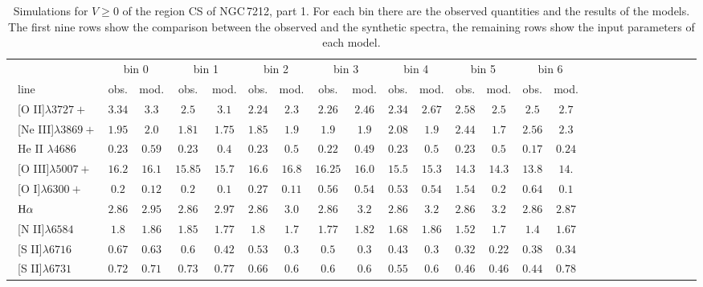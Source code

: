 \documentclass[../thesis.tex]{subfiles}
\begin{document}
\begin{landscape}
\begin{table}

\centering
\caption{Simulations for $V\ge0$ of the region CS of NGC\,7212, part 1. For each bin there are the observed quantities and the results of the models. The first nine rows show the comparison between the observed and the synthetic spectra, the remaining rows show the input parameters of each model.}
\label{tab:sim_cs+1N}


\small{
\begin{tabular}{lcccccccccccccccccccccccc}
\hline
\ &\multicolumn{2}{c}{bin 0} &\multicolumn{2}{c}{bin 1}&\multicolumn{2}{c}{bin 2}&\multicolumn{2}{c}{bin 3}&\multicolumn{2}{c}{bin 4}&\multicolumn{2}{c}{bin 5}&\multicolumn{2}{c}{bin 6}\\
\   line               &obs.  &mod. & obs. &mod.  &obs.&mod.  &obs.   &mod.&obs.  &mod.   &obs.  &mod.&obs.&mod.\\ \hline
\ [O II]$\lambda3727+$          &$3.34  $&$3.3   $&$2.5    $&$ 3.1  $&$2.24 $&$2.3   $&$2.26  $&$2.46 $&$2.34  $&$2.67  $&$2.58  $&$2.5$&$2.5$&$2.7$\\
\  [Ne III]$\lambda3869+$        &$1.95  $&$2.0   $&$1.81   $&$ 1.75 $&$1.85 $&$1.9   $&$1.9   $&$1.9   $&$2.08  $&$1.9   $&$2.44  $&$1.7$&$2.56$&$2.3$\\
\  He II $\lambda4686$           &$0.23  $&$0.59  $&$0.23   $&$ 0.4  $&$0.23 $&$0.5   $&$0.22  $&$0.49  $&$0.23  $&$0.5   $&$0.23  $&$0.5$&$0.17$&$0.24$\\
\  [O III]$\lambda5007+$         &$16.2  $&$16.1  $&$ 15.85 $&$ 15.7 $&$ 16.6$&$16.8  $&$16.25 $&$16.0  $&$15.5  $&$ 15.3 $&$14.3  $&$14.3$&$13.8$&$14.$\\
\  [O I]$\lambda6300+$           &$0.2   $&$0.12  $&$0.2    $&$0.1   $&$0.27 $&$0.11  $&$0.56  $&$0.54  $&$0.53  $&$0.54  $&$1.54  $&$0.2$&$0.64$&$0.1$\\
\ $\rm H\alpha$                 &$2.86  $&$2.95  $&$2.86   $&$ 2.97 $&$2.86 $&$3.0   $&$2.86  $&$3.2   $&$2.86  $&$3.2   $&$2.86  $&$3.2$&$2.86$&$2.87$\\
\  [N II]$\lambda6584$           &$1.8   $&$1.86  $&$1.85   $&$ 1.77 $&$1.8  $&$1.7   $&$1.77  $&$1.82  $&$1.68  $&$1.86  $&$1.52  $&$1.7$&$1.4$&$1.67$\\
\  [S II]$\lambda6716$           &$0.67  $&$0.63  $&$0.6    $&$ 0.42 $&$0.53 $&$0.3   $&$0.5   $&$0.3   $&$0.43  $&$0.3   $&$0.32  $&$0.22$&$0.38$&$0.34$\\
\  [S II]$\lambda6731$           &$0.72  $&$0.71  $&$0.73   $&$ 0.77 $&$0.66 $&$0.6   $&$0.6   $&$0.6   $&$0.55  $&$0.6   $&$0.46  $&$0.46$&$0.44$&$0.78$\\

\end{tabular}}
\end{table}
\end{landscape}
\end{document}
